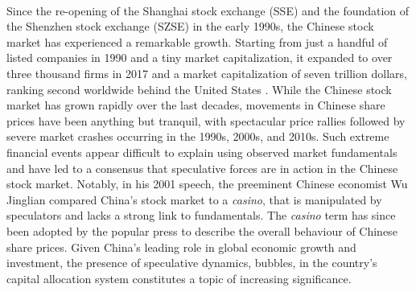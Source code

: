 \documentclass[11pt]{article}
\begin{document}
\paragraph{} Since the re-opening of the Shanghai stock exchange (SSE) and the foundation of the Shenzhen stock exchange (SZSE) in the early 1990s, the Chinese stock market has experienced a remarkable growth. Starting from just a handful of listed companies in 1990 and a tiny market capitalization, it expanded to over three thousand firms in 2017 and a market capitalization of seven trillion dollars, ranking second worldwide behind the United States \citep{carpenterW2017}. While the Chinese stock market has grown rapidly over the last decades, movements in Chinese share prices have been anything but tranquil, with spectacular price rallies followed by severe market crashes occurring in the 1990s, 2000s, and 2010s. Such extreme financial events appear difficult to explain using observed market fundamentals and have led to a consensus that speculative forces are in action in the Chinese stock market. Notably, in his 2001 speech, the preeminent Chinese economist Wu Jinglian compared China's stock market to a \textit{casino}, that is manipulated by speculators and lacks a strong link to fundamentals. The \textit{casino} term has since been adopted by the popular press to describe the overall behaviour of Chinese share prices. Given China's leading role in global economic growth and investment, the presence of speculative dynamics, bubbles, in the country's capital allocation system constitutes a topic of increasing significance. 
\end{document}
